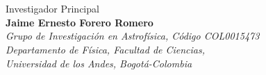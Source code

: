 %
\section*{}
\begin{center}
{\LARGE Investigador Principal }\\
{\LARGE \textbf{Jaime Ernesto Forero Romero} \\ 
\textit{Grupo de Investigación en Astrof\'isica, C\'odigo COL0015473} \\
\textit{Departamento de Física, Facultad de Ciencias, }\\
\textit{Universidad de los Andes, Bogot\'a-Colombia}}
\end{center}
